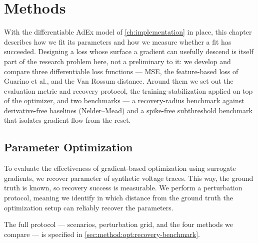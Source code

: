 \chapter{Methods}
\label{ch:methods}
With the differentiable \gls{AdEx} model of \cref{ch:implementation} in place, this chapter describes how we fit its parameters and how we measure whether a fit has succeeded.
Designing a loss whose surface a gradient can usefully descend is itself part of the research problem here, not a preliminary to it: we develop and compare three differentiable loss functions --- \gls{MSE}, the feature-based loss of Guarino et al., and the Van Rossum distance.
Around them we set out the evaluation metric and recovery protocol, the training-stabilization applied on top of the optimizer, and two benchmarks --- a recovery-radius benchmark against derivative-free baselines (Nelder--Mead) and a spike-free subthreshold benchmark that isolates gradient flow from the reset.

\section{Parameter Optimization}\label{sec:method:param_opt}
To evaluate the effectiveness of gradient-based optimization using surrogate gradients, we recover parameter of synthetic voltage traces.
This way, the ground truth is known, so recovery success is measurable.
We perform a perturbation protocol, meaning we identify in which distance from the ground truth the optimization setup can reliably recover the parameters.

The full protocol --- scenarios, perturbation grid, and the four methods we compare ---
is specified in \cref{sec:method:opt:recovery-benchmark}.

